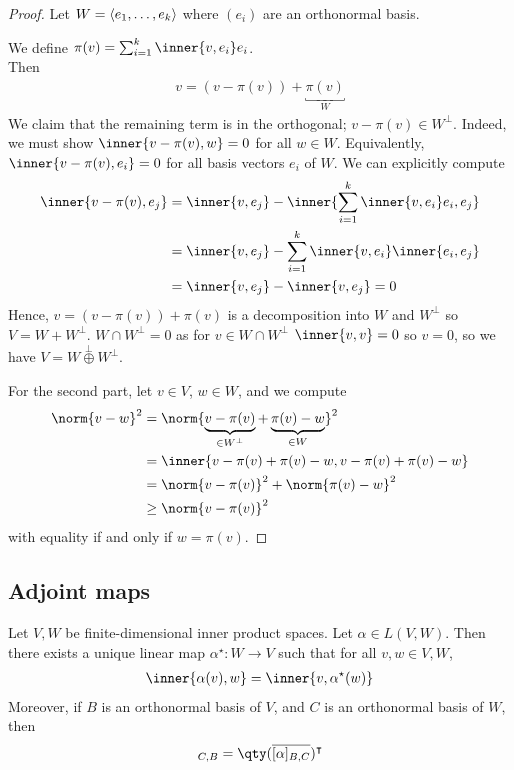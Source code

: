 \begin{proof}
	Let $W = \langle{} e_1, \dots, e_k \rangle$ where $(e_i)$ are an orthonormal basis.

	We define $\pi(v) = \sum_{i=1}^k \inner{v, e_i} e_i$. \\
	Then \begin{align*}
		v = (v - \pi(v)) + \underbracket{\pi(v)}_{W}
	\end{align*} 
	We claim that the remaining term is in the orthogonal; $v - \pi(v) \in W^\perp$.
	Indeed, we must show $\inner{v - \pi(v), w} = 0$ for all $w \in W$.
	Equivalently, $\inner{v - \pi(v), e_i} = 0$ for all basis vectors $e_i$ of $W$.
	We can explicitly compute
	\begin{align*}
		\inner{v - \pi(v), e_j} &= \inner{v, e_j} - \inner{\sum_{i=1}^k \inner{v, e_i} e_i, e_j} \\
		&= \inner{v, e_j} - \sum_{i=1}^k \inner{v, e_i} \inner{e_i, e_j} \\
		&= \inner{v, e_j} - \inner{v, e_j} = 0
	\end{align*}
	Hence, $v = (v - \pi(v)) + \pi(v)$ is a decomposition into $W$ and $W^\perp$ so $V = W + W^\perp$.
	$W \cap W^\perp = \qty{0}$ as for $v \in W \cap W^\perp$ $\inner{v, v} = 0$ so $v = 0$, so we have $V = W \overset{\perp}{\oplus} W^\perp$.

	For the second part, let $v \in V$, $w \in W$, and we compute
	\begin{align*}
		\norm{v - w}^2 &= \norm{\underbrace{v - \pi(v)}_{\in W^\perp} + \underbrace{\pi(v) - w}_{\in W}}^2 \\
		&= \inner{v - \pi(v) + \pi(v) - w, v - \pi(v) + \pi(v) - w} \\
		&= \norm{v - \pi(v)}^2 + \norm{\pi(v) - w}^2 \\
		&\geq \norm{v - \pi(v)}^2
	\end{align*}
	with equality if and only if $w = \pi(v)$.
\end{proof}

\subsection{Adjoint maps}
\begin{definition}
	Let $V, W$ be finite-dimensional inner product spaces.
	Let $\alpha \in L(V, W)$.
	Then there exists a unique linear map $\alpha^\star \colon W \to V$ such that for all $v, w \in V, W$,
	\begin{align*}
		\inner{\alpha(v), w} = \inner{v, \alpha^\star(w)}
	\end{align*}
	Moreover, if $B$ is an orthonormal basis of $V$, and $C$ is an orthonormal basis of $W$, then
	\begin{align*}
		[\alpha^\star]_{C, B} = \qty(\overline{[\alpha]_{B, C}})^\transpose
	\end{align*}
\end{definition}

